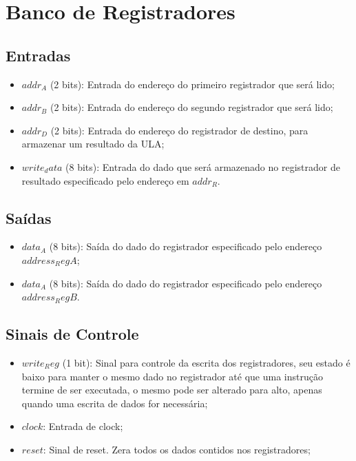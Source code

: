 \documentclass{report}
\begin{document}
    \section{Banco de Registradores}
    \subsection{Entradas}
\begin{itemize}
        \item $addr_A$ (2 bits): Entrada do endereço do primeiro registrador que será lido;
		\item $addr_B$ (2 bits): Entrada do endereço do segundo registrador que será lido;
		\item $addr_D$ (2 bits): Entrada do endereço do registrador de destino, para 					armazenar um resultado da ULA;
		\item $write_data$ (8 bits): Entrada do dado que será armazenado no registrador de 				resultado especificado pelo endereço em $addr_R$.
\end{itemize}

\subsection{Saídas}
\begin{itemize}
\item $data_A$ (8 bits): Saída do dado do registrador especificado pelo endereço $address_RegA$;
\item $data_A$ (8 bits): Saída do dado do registrador especificado pelo endereço $address_RegB$.
\end{itemize}

\subsection{Sinais de Controle}
\begin{itemize}
\item $write_Reg$ (1 bit): Sinal para controle da escrita dos registradores, seu estado é baixo para manter o mesmo dado no registrador até que uma instrução termine de ser executada, o mesmo pode ser alterado para alto, apenas quando uma escrita de dados for necessária;
\item $clock$: Entrada de clock;
\item $reset$: Sinal de reset. Zera todos os dados contidos nos registradores;
\end{itemize}
    

% 
% 
\end{document}
